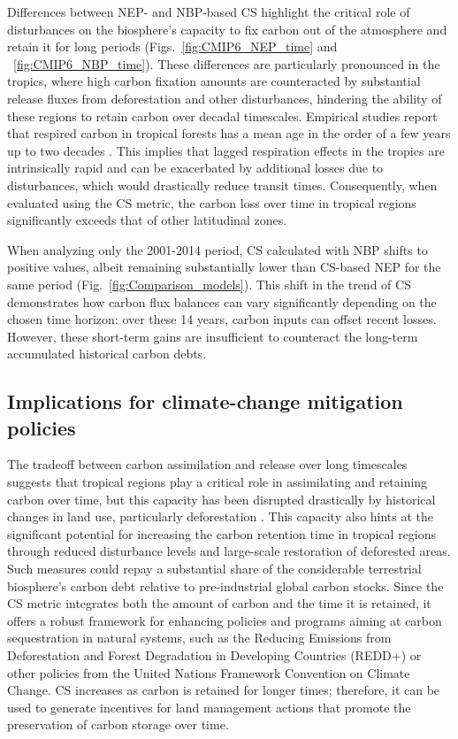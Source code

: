 \documentclass[9pt,twocolumn,twoside]{pnas-new}
\begin{document}
Differences between NEP- and NBP-based CS highlight the critical role of disturbances on the biosphere's capacity to fix carbon out of the atmosphere and retain it for long periods (Figs.~\ref{fig:CMIP6_NEP_time} and ~\ref{fig:CMIP6_NBP_time}). These differences are particularly pronounced in the tropics, where high carbon fixation amounts are counteracted by substantial release fluxes from deforestation and other disturbances, hindering the ability of these regions to retain carbon over decadal timescales. Empirical studies report that respired carbon in tropical forests has a mean age in the order of a few years up to two decades \cite{Sierra2021JE,Chanca2025}. This implies that lagged respiration effects in the tropics are intrinsically rapid and can be exacerbated by additional losses due to disturbances, which would drastically reduce transit times. Consequently, when evaluated using the CS metric, the carbon loss over time in tropical regions significantly exceeds that of other latitudinal zones. 

When analyzing only the 2001-2014 period, CS calculated with NBP shifts to positive values, albeit remaining substantially lower than CS-based NEP for the same period (Fig.~\ref{fig:Comparison_models}). This shift in the trend of CS demonstrates how carbon flux balances can vary significantly depending on the chosen time horizon: over these 14 years, carbon inputs can offset recent losses. However, these short-term gains are insufficient to counteract the long-term accumulated historical carbon debts. 

\subsection*{Implications for climate-change mitigation policies}
The tradeoff between carbon assimilation and release over long timescales suggests that tropical regions play a critical role in assimilating and retaining carbon over time, but this capacity has been disrupted drastically by historical changes in land use, particularly deforestation \cite{Li2022}. This capacity also hints at the significant potential for increasing the carbon retention time in tropical regions through reduced disturbance levels and large-scale restoration of deforested areas. Such measures could repay a substantial share of the considerable terrestrial biosphere's carbon debt relative to pre-industrial global carbon stocks. Since the CS metric integrates both the amount of carbon and the time it is retained, it offers a robust framework for enhancing policies and programs aiming at carbon sequestration in natural systems, such as the Reducing Emissions from Deforestation and Forest Degradation in Developing Countries (REDD+) or other policies from the United Nations Framework Convention on Climate Change. CS increases as carbon is retained for longer times; therefore, it can be used to generate incentives for land management actions that promote the preservation of carbon storage over time. 
\end{document}
